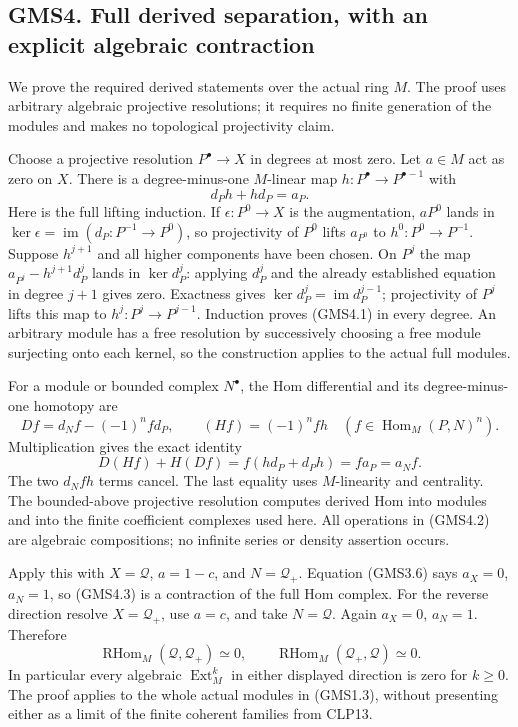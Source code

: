 \subsection{GMS4. Full derived separation, with an explicit algebraic
contraction}\label{gms4.-full-derived-separation-with-an-explicit-algebraic-contraction}

We prove the required derived statements over the actual ring \(M\). The
proof uses arbitrary algebraic projective resolutions; it requires no
finite generation of the modules and makes no topological projectivity
claim.

Choose a projective resolution \(P^\bullet\to X\) in degrees at most
zero. Let \(a\in M\) act as zero on \(X\). There is a degree-minus-one
\(M\)-linear map \(h:P^\bullet\to P^{\bullet-1}\) with \[
d_Ph+h d_P=a_P.
\tag{GMS4.1}
\] Here is the full lifting induction. If \(\epsilon:P^0\to X\) is the
augmentation, \(aP^0\) lands in
\(\ker\epsilon=\operatorname{im}(d_P:P^{-1}\to P^0)\), so projectivity
of \(P^0\) lifts \(a_{P^0}\) to \(h^0:P^0\to P^{-1}\). Suppose
\(h^{j+1}\) and all higher components have been chosen. On \(P^j\) the
map \(a_{P^j}-h^{j+1}d_P^j\) lands in \(\ker d_P^j\): applying \(d_P^j\)
and the already established equation in degree \(j+1\) gives zero.
Exactness gives \(\ker d_P^j=\operatorname{im}d_P^{j-1}\); projectivity
of \(P^j\) lifts this map to \(h^j:P^j\to P^{j-1}\). Induction proves
(GMS4.1) in every degree. An arbitrary module has a free resolution by
successively choosing a free module surjecting onto each kernel, so the
construction applies to the actual full modules.

For a module or bounded complex \(N^\bullet\), the Hom differential and
its degree-minus-one homotopy are \[
Df=d_Nf-(-1)^n f d_P,\qquad
(Hf)=(-1)^n f h\quad(f\in\operatorname{Hom}_M(P,N)^n).
\tag{GMS4.2}
\] Multiplication gives the exact identity \[
D(Hf)+H(Df)=f(hd_P+d_Ph)=f a_P=a_N f.
\tag{GMS4.3}
\] The two \(d_Nfh\) terms cancel. The last equality uses
\(M\)-linearity and centrality. The bounded-above projective resolution
computes derived Hom into modules and into the finite coefficient
complexes used here. All operations in (GMS4.2) are algebraic
compositions; no infinite series or density assertion occurs.

Apply this with \(X=\mathcal Q\), \(a=1-c\), and \(N=\mathcal Q_+\).
Equation (GMS3.6) says \(a_X=0\), \(a_N=1\), so (GMS4.3) is a
contraction of the full Hom complex. For the reverse direction resolve
\(X=\mathcal Q_+\), use \(a=c\), and take \(N=\mathcal Q\). Again
\(a_X=0\), \(a_N=1\). Therefore \[
\boxed{
\operatorname{RHom}_M(\mathcal Q,\mathcal Q_+)\simeq0,
\qquad
\operatorname{RHom}_M(\mathcal Q_+,\mathcal Q)\simeq0.
}
\tag{GMS4.4}
\] In particular every algebraic \(\operatorname{Ext}^k_M\) in either
displayed direction is zero for \(k\ge0\). The proof applies to the
whole actual modules in (GMS1.3), without presenting either as a limit
of the finite coherent families from CLP13.


